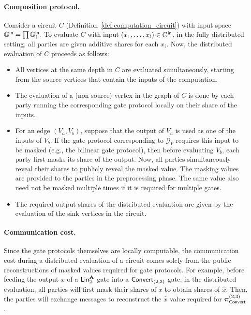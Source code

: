 \paragraph{Composition protocol.} Consider a circuit $C$ (Definition~\ref{def:computation_circuit}) with input space $\mathbb{G}^{\textsf{in}} = \prod \mathbb{G}^{\textsf{in}}_i$. To evaluate $C$ with input $(x_1, \dots, x_l) \in \mathbb{G}^{\textsf{in}}$, in the fully distributed setting, all parties are given additive shares for each $x_i$. Now, the distributed evaluation of $C$ proceeds as follows:
\begin{itemize}
  
  \item All vertices at the same depth in $C$ are evaluated simultaneously, starting from the source vertices that contain the inputs of the computation. 

  \item The evaluation of a (non-source) vertex in the graph of $C$ is done by each party running the corresponding gate protocol locally on their share of the inputs. 

  \item For an edge $(V_a, V_b)$, suppose that the output of $V_a$ is used as one of the inputs of $V_b$. If the gate protocol corresponding to $\mathcal{G}_V$ requires this input to be masked (e.g., the bilinear gate protocol), then before evaluating $V_b$, each party first masks its share of the output. Now, all parties simultaneously reveal their shares to publicly reveal the masked value.   The masking values are provided to the parties in the preprocessing phase. The same value also need not be masked multiple times if it is required for multiple gates.

  \item The required output shares of the distributed evaluation are given by the evaluation of the sink vertices in the circuit.
\end{itemize}

\paragraph{Communication cost.}
Since the gate protocols themselves are locally computable, the communication cost during a distributed evaluation of a circuit comes solely from the public reconstructions of masked values required for gate protocols. For example, before feeding the output $x$ of a $\LMap^{\mat{A}}_2$ gate into a $\textnormal{\textsf{Convert}}_{(2,3)}$ gate, in the distributed evaluation, all parties will first mask their shares of $x$ to obtain shares of $\hat{x}$. Then, the parties will exchange messages to reconstruct the $\hat{x}$ value required for $\boldsymbol{\pi}_{\textnormal{\textsf{Convert}}}^{(2,3)}$.

